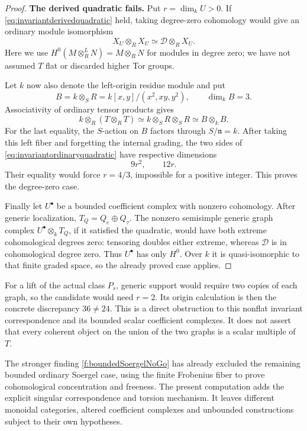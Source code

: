 \documentclass[11pt,a4paper]{article}
\newcommand{\mathscr}{\mathcal}
\theoremstyle{named}\newtheorem{finding}{Finding}[section]
\theoremstyle{definition}\newtheorem{definition}[finding]{Definition}
\theoremstyle{remark}\newtheorem{remark}[finding]{Remark}
\begin{document}
\begin{proof}
\par\smallskip\noindent\textbf{The derived quadratic fails.}\quad
Put \(r=\dim_kU>0\). If
\eqref{eq:invariantderivedquadratic} held, taking degree-zero
cohomology would give an ordinary module isomorphism
\begin{equation}\label{eq:invariantordinaryquadratic}
 X_U\otimes_R X_U\simeq\mathscr D\otimes_R X_U.
\end{equation}
Here we use
\(H^0(M\otimes_R^L N)=M\otimes_RN\) for modules in degree
zero; we have not assumed \(T\) flat or discarded higher Tor
groups.

Let \(k\) now also denote the left-origin residue module and
put
\[
 B=k\otimes_S R=k[x,y]/(x^2,xy,y^2),\qquad \dim_kB=3.
\]
Associativity of ordinary tensor products gives
\begin{equation}\label{eq:invariantdoublefiber}
 k\otimes_R(T\otimes_R T)
      \simeq k\otimes_S R\otimes_S R
      \simeq B\otimes_k B.
\end{equation}
For the last equality, the \(S\)-action on \(B\) factors
through \(S/\mathfrak n=k\). After taking this left fiber
and forgetting the internal grading, the two sides of
\eqref{eq:invariantordinaryquadratic} have respective
dimensions
\[
                            9r^2,\qquad 12r.
\]
Their equality would force \(r=4/3\), impossible for a
positive integer. This proves the degree-zero case.

Finally let \(U^\bullet\) be a bounded coefficient complex
with nonzero cohomology. After generic localization,
\(T_Q=Q_e\oplus Q_\tau\). The nonzero semisimple generic
graph complex \(U^\bullet\otimes_k T_Q\), if it satisfied
the quadratic, would have both extreme cohomological
degrees zero: tensoring doubles either extreme, whereas
\(\mathscr D\) is in cohomological degree zero.
Thus \(U^\bullet\) has only \(H^0\). Over \(k\) it is
quasi-isomorphic to that finite graded space, so the
already proved case applies.
\end{proof}

For a lift of the actual class \(P_s\), generic support
would require two copies of each graph, so the candidate
would need \(r=2\). Its origin calculation is then the
concrete discrepancy \(36\ne24\).
This is a direct obstruction to this nonflat invariant
correspondence and its bounded scalar coefficient
complexes. It does not assert that every coherent object
on the union of the two graphs is a scalar multiple of
\(T\).

The stronger finding \ref{f:boundedSoergelNoGo} has already
excluded the remaining bounded ordinary Soergel case,
using the finite Frobenius fiber to prove cohomological
concentration and freeness. The present computation adds
the explicit singular correspondence and torsion
mechanism. It leaves different monoidal categories,
altered coefficient complexes and unbounded constructions
subject to their own hypotheses.
\end{document}
